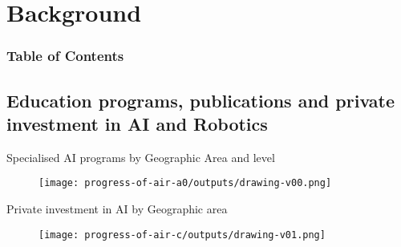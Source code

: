 \section{Background}


\begin{frame}
      \frametitle{Table of Contents}
      \tableofcontents[currentsection]
\end{frame}



\subsection{Education programs, publications and private investment in AI and Robotics}

{

\begin{frame}{Specialised AI programs by Geographic Area and level}

\begin{figure}
 \centering
 \texttt{[image: progress-of-air-a0/outputs/drawing-v00.png]}
\end{figure}

\end{frame}
}

{

\begin{frame}{
Private investment in AI by Geographic area
}

\begin{figure}
 \centering
 \texttt{[image: progress-of-air-c/outputs/drawing-v01.png]}
\end{figure}

\end{frame}
}



%
%
%
%
%

